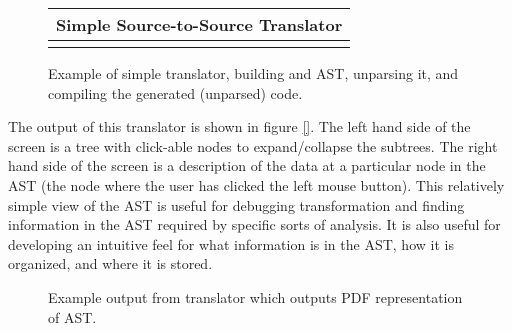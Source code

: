 {\indent
{\mySmallFontSize

\begin{latexonly}
%  
\begin{figure}[tb]
\begin{center}
\begin{tabular}{|c|} \hline
     Simple Source-to-Source Translator
\\\hline\hline

\\\hline
\end{tabular}
\end{center}
\caption{ Example of simple translator, building and AST, unparsing it, and compiling
    the generated (unparsed) code. }
\end{figure}
\end{latexonly}

\begin{htmlonly}
   
\end{htmlonly}

\label{translatorDesign:AstPDFOutputTranslator}

}
}


The output of this translator is shown in figure \ref{}.  The left hand side
of the screen is a tree with click-able nodes to expand/collapse the subtrees.
The right hand side of the screen is a description of the data at a particular 
node in the AST (the node where the user has clicked the left mouse button).
This relatively simple view of the AST is useful for debugging transformation and finding
information in the AST required by specific sorts of analysis.  It is also useful
for developing an intuitive feel for what information is in the AST, how it is organized, 
and where it is stored.

\begin{figure}
\centerline{}
\caption{Example output from translator which outputs PDF representation of AST.}
\label{translatorDesign:pdfOutput1.ps}
\end{figure}

